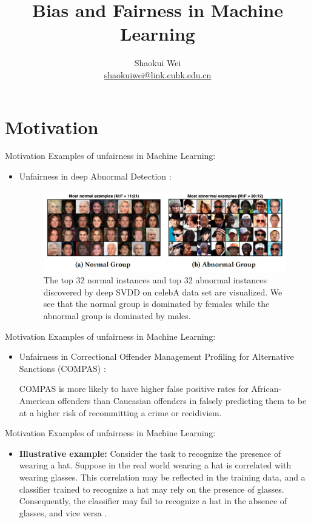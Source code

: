 \documentclass[10pt, xcolor=table,aspectratio=169]{beamer}
\title{\large \bfseries Bias and Fairness in Machine Learning}
\author{Shaokui Wei \\\href{mailto:shaokuiwei@link.cuhk.edu.cn}{shaokuiwei@link.cuhk.edu.cn}
}
\institute{School of Data Science\\The Chinese University of Hong Kong, Shenzhen, China}
\begin{document}
\frame{
	\thispagestyle{empty}
	\titlepage
}
\section{Motivation}
\begin{frame}{Motivation}
	Examples of unfairness in Machine Learning:
	\begin{itemize}
		\item Unfairness in deep Abnormal Detection \cite{zhang2021towards}:
		      \begin{figure}[t]
			      \begin{center}
				      \includegraphics[width=0.8\columnwidth]{./figs/abnormal.png}
			      \end{center}
			      \caption{The top 32 normal instances and top 32 abnormal instances
				      discovered by deep SVDD on celebA data set are visualized. We see that the normal group is dominated by females while the abnormal
				      group is dominated by males.}
		      \end{figure}
	\end{itemize}

\end{frame}

\begin{frame}{Motivation}
	Examples of unfairness in Machine Learning:
	\begin{itemize}
		\item Unfairness in Correctional Offender Management Profiling for Alternative Sanctions (COMPAS) \cite{mehrabi2021survey}:

		      COMPAS is more likely to have higher false positive rates for African-American offenders than Caucasian offenders in falsely predicting them to be at a higher risk of recommitting a crime or recidivism.
	\end{itemize}

\end{frame}

\begin{frame}{Motivation}
	Examples of unfairness in Machine Learning:
	\begin{itemize}
		\item  \textbf{Illustrative example:} Consider the task to recognize the presence of wearing a hat. Suppose in the real world wearing a hat is correlated with wearing glasses. This correlation may be reflected in the training data, and a classifier trained to recognize a hat may rely on the presence of glasses. Consequently, the classifier may fail to recognize a hat in the absence of glasses, and vice versa \cite{ramaswamy2021fair}.
	\end{itemize}

\end{frame}
\end{document}
